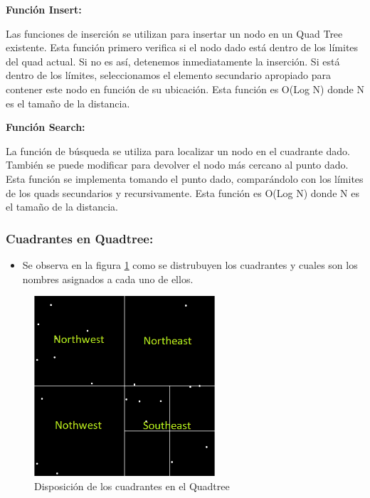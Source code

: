 \documentclass{article}
\begin{document}
\vspace{5mm}
\textbf{Función Insert:}

Las funciones de inserción se utilizan para insertar un nodo en un Quad Tree existente. Esta función primero verifica si el nodo dado está dentro de los límites del quad actual. Si no es así, detenemos inmediatamente la inserción. Si está dentro de los límites, seleccionamos el elemento secundario apropiado para contener este nodo en función de su ubicación. Esta función es O(Log N) donde N es el tamaño de la distancia.

\vspace{5mm}
\textbf{Función Search:}

La función de búsqueda se utiliza para localizar un nodo en el cuadrante dado. También se puede modificar para devolver el nodo más cercano al punto dado. Esta función se implementa tomando el punto dado, comparándolo con los límites de los quads secundarios y recursivamente. Esta función es O(Log N) donde N es el tamaño de la distancia.
\clearpage
\subsubsection{Cuadrantes en Quadtree: }
\begin{itemize}
    \item Se observa en la figura \ref{fig:quadtree_cuadrante} como se distrubuyen los cuadrantes y cuales son los nombres asignados a cada uno de ellos.
\end{itemize}
\begin{figure}[htbp]
\centering
\includegraphics[width=0.6\textwidth]{img/quadtree_cuadrante.png}
\caption{Disposición de los cuadrantes en el Quadtree}
\label{fig:quadtree_cuadrante}
\end{figure}
\end{document}
